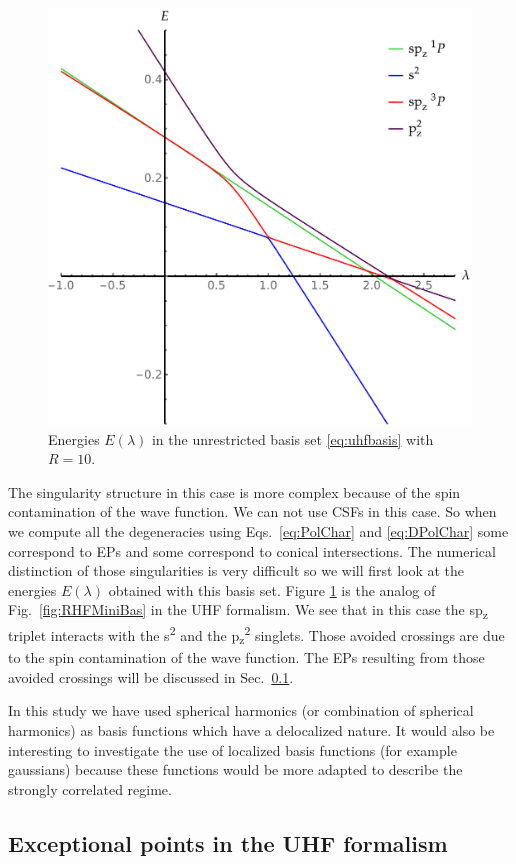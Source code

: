 \documentclass[11pt,a4paper]{article}
\begin{document}
\begin{figure}
    \centering
    \includegraphics[width=0.5\linewidth]{EMP_UHF_R10.pdf}
    \caption{Energies $E(\lambda)$ in the unrestricted basis set \eqref{eq:uhfbasis} with $R=10$.}
    \label{fig:UHFMiniBas}
\end{figure}

The singularity structure in this case is more complex because of the spin contamination of the wave function. We can not use CSFs in this case. So when we compute all the degeneracies using Eqs.~\eqref{eq:PolChar} and \eqref{eq:DPolChar} some correspond to EPs and some correspond to conical intersections. The numerical distinction of those singularities is very difficult so we will first look at the energies $E(\lambda)$ obtained with this basis set.
Figure \ref{fig:UHFMiniBas} is the analog of Fig.~\ref{fig:RHFMiniBas} in the UHF formalism. We see that in this case the sp\textsubscript{z} triplet interacts with the s\textsuperscript{2} and the p\textsubscript{z}\textsuperscript{2} singlets. Those avoided crossings are due to the spin contamination of the wave function. The EPs resulting from those avoided crossings will be discussed in Sec.~\ref{sec:uhfSing}.

In this study we have used spherical harmonics (or combination of spherical harmonics) as basis functions which have a delocalized nature. It would also be interesting to investigate the use of localized basis functions \cite{Seidl_2018} (for example gaussians) because these functions would be more adapted to describe the strongly correlated regime.

\subsection{Exceptional points in the UHF formalism}\label{sec:uhfSing}
\end{document}
